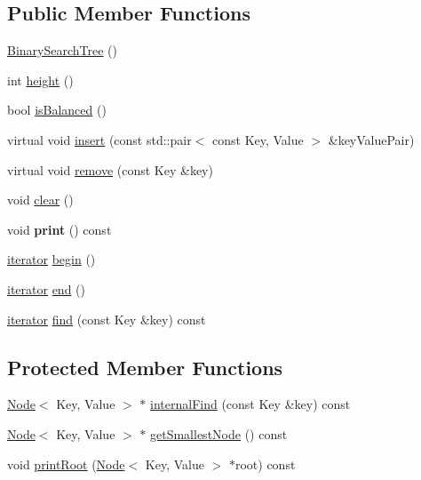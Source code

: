 \subsection*{Public Member Functions}
\begin{DoxyCompactItemize}
\item 
\mbox{\hyperlink{classBinarySearchTree_ad755ed0485364094f462ce45cf6ecf62}{Binary\+Search\+Tree}} ()
\item 
int \mbox{\hyperlink{classBinarySearchTree_af3cd6ac851903ea24fb3be48f10c4015}{height}} ()
\item 
bool \mbox{\hyperlink{classBinarySearchTree_afd462b85819b2ed73bde24c3383b673b}{is\+Balanced}} ()
\item 
virtual void \mbox{\hyperlink{classBinarySearchTree_a20c129156570a782fe10b1d803928a4c}{insert}} (const std\+::pair$<$ const Key, Value $>$ \&key\+Value\+Pair)
\item 
virtual void \mbox{\hyperlink{classBinarySearchTree_a23a65055a8e1d1f501f89140c219bda2}{remove}} (const Key \&key)
\item 
void \mbox{\hyperlink{classBinarySearchTree_acce1030d8eb99522591b90e0824e7bbc}{clear}} ()
\item 
\mbox{\label{classBinarySearchTree_acaffd92012c913f3a04a75dd6d07d488}} 
void {\bfseries print} () const
\item 
\mbox{\hyperlink{classBinarySearchTree_1_1iterator}{iterator}} \mbox{\hyperlink{classBinarySearchTree_ac42b6e11e290cf9eaf56eba56ca56818}{begin}} ()
\item 
\mbox{\hyperlink{classBinarySearchTree_1_1iterator}{iterator}} \mbox{\hyperlink{classBinarySearchTree_a6603b43057a4bf2843381b8abcb0d010}{end}} ()
\item 
\mbox{\hyperlink{classBinarySearchTree_1_1iterator}{iterator}} \mbox{\hyperlink{classBinarySearchTree_ad8772cfce540ec1d9279c674bdb01e40}{find}} (const Key \&key) const
\end{DoxyCompactItemize}
\subsection*{Protected Member Functions}
\begin{DoxyCompactItemize}
\item 
\mbox{\hyperlink{classNode}{Node}}$<$ Key, Value $>$ $\ast$ \mbox{\hyperlink{classBinarySearchTree_aed5147cde1f6bb15aa192456b7a1f20c}{internal\+Find}} (const Key \&key) const
\item 
\mbox{\hyperlink{classNode}{Node}}$<$ Key, Value $>$ $\ast$ \mbox{\hyperlink{classBinarySearchTree_a04d73a5c985288b8837c2629c3ee0e39}{get\+Smallest\+Node}} () const
\item 
void \mbox{\hyperlink{classBinarySearchTree_a6996f52ecfb5a0d1f62432a7b3b792b5}{print\+Root}} (\mbox{\hyperlink{classNode}{Node}}$<$ Key, Value $>$ $\ast$root) const
\end{DoxyCompactItemize}
